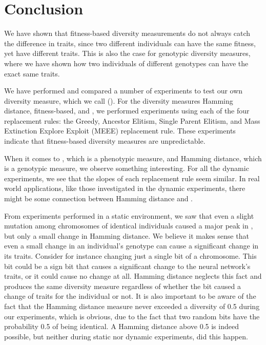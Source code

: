 \section{Conclusion}\label{sec:conclusion}
We have shown that fitness-based diversity measurements do not always catch the difference in traits, since two different individuals can have the same fitness, yet have different traits.
This is also the case for genotypic diversity measures, where we have shown how two individuals of different genotypes can have the exact same traits.

We have performed and compared a number of experiments to test our own diversity measure, which we call \di{} (\dia{}).
For the diversity measures Hamming distance, fitness-based, and \dia{}, we performed experiments using each of the four replacement rules: the Greedy, Ancestor Elitism, Single Parent Elitism, and Mass Extinction Explore Exploit (MEEE) replacement rule. These experiments indicate that fitness-based diversity measures are unpredictable.

When it comes to \dia{}, which is a phenotypic measure, and Hamming distance, which is a genotypic measure, we observe something interesting. For all the dynamic experiments, we see that the slopes of each replacement rule seem similar. In real world applications, like those investigated in the dynamic experiments, there might be some connection between Hamming distance and \dia{}.

From experiments performed in a static environment, we saw that even a slight mutation among chromosomes of identical individuals caused a major peak in \dia{}, but only a small change in Hamming distance.
We believe it makes sense that even a small change in an individual's genotype can cause a significant change in its traits. Consider for instance changing just a single bit of a chromosome. This bit could be a sign bit that causes a significant change to the neural network's traits, or it could cause no change at all.
Hamming distance neglects this fact and produces the same diversity measure regardless of whether the bit caused a change of traits for the individual or not.
It is also important to be aware of the fact that the Hamming distance measure never exceeded a diversity of \num{0.5} during our experiments, which is obvious, due to the fact that two random bits have the probability \num{0.5} of being identical.
A Hamming distance above \num{0.5} is indeed possible, but neither during static nor dynamic experiments, did this happen. 

